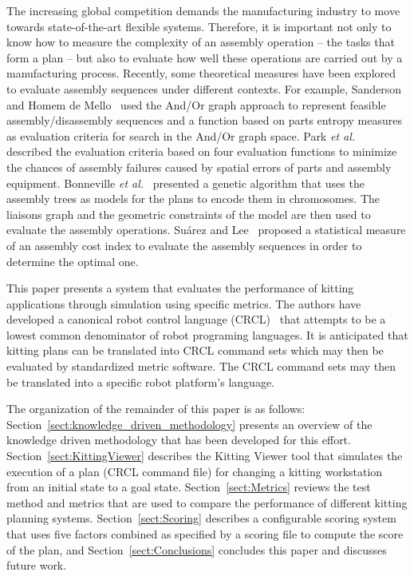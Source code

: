 The increasing global competition demands the manufacturing industry to
move towards state-of-the-art flexible systems. Therefore, it is important
not only to know how to measure the complexity of an assembly operation --
the tasks that form a plan -- but also to evaluate how well these
operations are carried out by a manufacturing process. Recently, some
theoretical measures have been explored to evaluate assembly sequences
under different contexts. For example, Sanderson and Homem de
Mello~\cite{SANDERSON.1987} used the And/Or graph approach to represent
feasible assembly/disassembly sequences and a function based on parts
entropy measures as evaluation criteria for search in the And/Or graph
space. Park \textit{et al.}~\cite{PARK.1991} described the evaluation
criteria based on four evaluation functions to minimize the chances of
assembly failures caused by spatial errors of parts and assembly equipment.
Bonneville \textit{et al.}~\cite{BONNEVILLE.1995} presented a genetic
algorithm that uses the assembly trees as models for the plans to encode
them in chromosomes. The liaisons graph and the geometric constraints of
the model are then used to evaluate the assembly operations. Su\'{a}rez and
Lee~\cite{SUAREZ.1997} proposed a statistical measure of an assembly cost
index to evaluate the assembly sequences in order to determine the optimal
one.


This paper presents a system that evaluates the performance of kitting
applications through simulation using specific metrics. The authors have
developed a canonical robot control language
(CRCL)~\cite{NISTIR.Balakirsky} that attempts to be a lowest common
denominator of robot programing languages. It is anticipated that kitting
plans can be translated into CRCL command sets which may then be evaluated
by standardized metric software. The CRCL command sets may then be
translated into a specific robot platform's language.

The organization of the remainder of this paper is as follows:
Section~\ref{sect:knowledge_driven_methodology} presents an overview of the
knowledge driven methodology that has been developed for this effort.
Section~\ref{sect:KittingViewer} describes the Kitting Viewer tool that
simulates the execution of a plan (CRCL command file) for changing a
kitting workstation from an initial state to a goal state.
Section~\ref{sect:Metrics} reviews the test method and metrics that are
used to compare the performance of different kitting planning systems.
Section~\ref{sect:Scoring} describes a configurable scoring system that
uses five factors combined as specified by a scoring file to compute the
score of the plan, and Section~\ref{sect:Conclusions} concludes this paper
and discusses future work.


